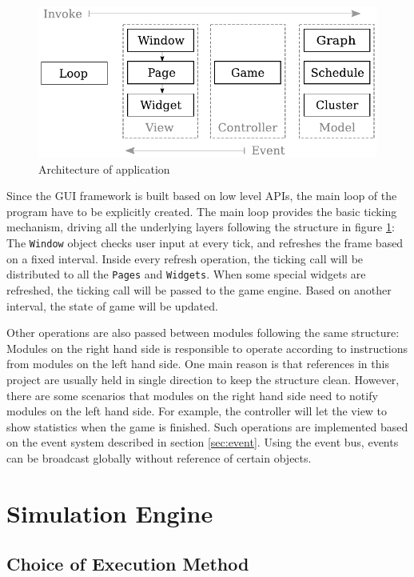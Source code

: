 \documentclass[msc,deptreport, cs]{infthesis}
\begin{document}
\begin{figure}[!htb] 
  \centering
  \includegraphics[width=0.65\columnwidth]{architecture.pdf} \vspace{-0.3em}
  \caption{Architecture of application}
  \label{fig:architecture}
\end{figure} \vspace{-0.5em}

Since the GUI framework is built based on low level APIs, the main loop of the program have to be explicitly created. The main loop provides the basic ticking mechanism, driving all the underlying layers following the structure in figure \ref{fig:architecture}: The \verb+Window+ object checks user input at every tick, and refreshes the frame based on a fixed interval. Inside every refresh operation, the ticking call will be distributed to all the \verb+Pages+ and \verb+Widgets+. When some special widgets are refreshed, the ticking call will be passed to the game engine. Based on another interval, the state of game will be updated.

Other operations are also passed between modules following the same structure: Modules on the right hand side is responsible to operate according to instructions from modules on the left hand side. One main reason is that references in this project are usually held in single direction to keep the structure clean. However, there are some scenarios that modules on the right hand side need to notify modules on the left hand side. For example, the controller will let the view to show statistics when the game is finished. Such operations are implemented based on the event system described in section \ref{sec:event}. Using the event bus, events can be broadcast globally without reference of certain objects.

\section{Simulation Engine}

\subsection{Choice of Execution Method}
\end{document}
